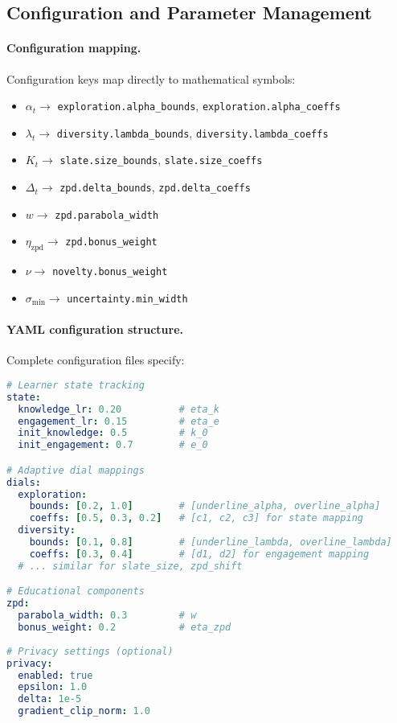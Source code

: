 \subsection{Configuration and Parameter Management}
\label{app:configuration}

\paragraph{Configuration mapping.} Configuration keys map directly to mathematical symbols:
\begin{itemize}
  \item $\alpha_t \rightarrow$ \texttt{exploration.alpha\_bounds}, \texttt{exploration.alpha\_coeffs}
  \item $\lambda_t \rightarrow$ \texttt{diversity.lambda\_bounds}, \texttt{diversity.lambda\_coeffs}
  \item $K_t \rightarrow$ \texttt{slate.size\_bounds}, \texttt{slate.size\_coeffs}
  \item $\Delta_t \rightarrow$ \texttt{zpd.delta\_bounds}, \texttt{zpd.delta\_coeffs}
  \item $w \rightarrow$ \texttt{zpd.parabola\_width}
  \item $\eta_{\mathrm{zpd}} \rightarrow$ \texttt{zpd.bonus\_weight}
  \item $\nu \rightarrow$ \texttt{novelty.bonus\_weight}
  \item $\sigma_{\min} \rightarrow$ \texttt{uncertainty.min\_width}
\end{itemize}

\paragraph{YAML configuration structure.} Complete configuration files specify:
\begin{lstlisting}[language=yaml]
# Learner state tracking
state:
  knowledge_lr: 0.20          # eta_k
  engagement_lr: 0.15         # eta_e
  init_knowledge: 0.5         # k_0
  init_engagement: 0.7        # e_0

# Adaptive dial mappings  
dials:
  exploration:
    bounds: [0.2, 1.0]        # [underline_alpha, overline_alpha]
    coeffs: [0.5, 0.3, 0.2]   # [c1, c2, c3] for state mapping
  diversity:
    bounds: [0.1, 0.8]        # [underline_lambda, overline_lambda] 
    coeffs: [0.3, 0.4]        # [d1, d2] for engagement mapping
  # ... similar for slate_size, zpd_shift

# Educational components
zpd:
  parabola_width: 0.3         # w
  bonus_weight: 0.2           # eta_zpd
  
# Privacy settings (optional)
privacy:
  enabled: true
  epsilon: 1.0
  delta: 1e-5
  gradient_clip_norm: 1.0
\end{lstlisting}

